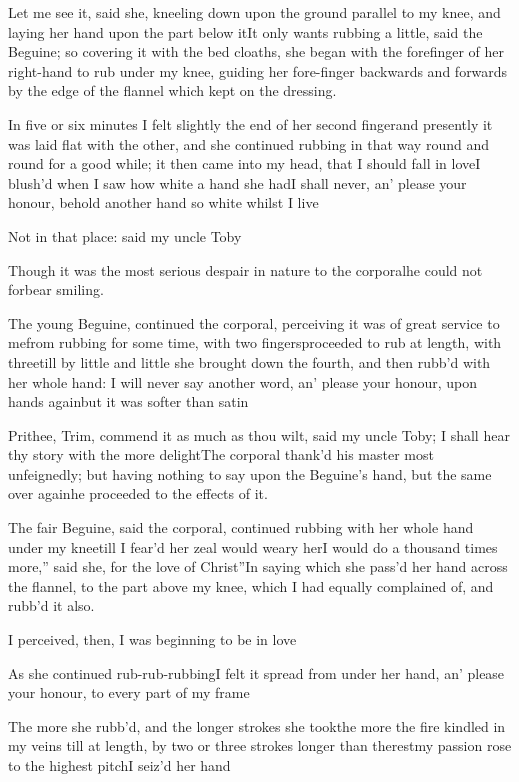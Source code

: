 \documentclass[twoside]{article}
\begin{document}
Let me see it, said she, kneeling down upon the ground parallel
to my knee, and laying her hand upon the part below
it\tsh It only wants rubbing a little, said the
Beguine; so covering it with the bed cloaths, she began with
the forefinger of her right-hand to rub under my knee, guiding her
fore-finger backwards and forwards by the edge of the flannel which
kept on the dressing.

In five or six minutes I felt slightly the end of
her second finger\tsk and presently it was laid flat with the
other, and she continued rubbing in that way round and round for a
good while; it then came into my head, that I should fall in
love\tsk\break I blush’d when I saw how white a hand she
had\tsk I shall never, an’ please your honour, behold
another hand so white whilst I live\tsh

\tsh Not in that place: said my uncle
Toby\tsh

Though it was the most serious des\-pair in nature to the
corporal\tsk he could not forbear smiling.

The young Beguine, continued the corporal, perceiving it
was of great service to me\tsk from rubbing for some time, with
two fingers\tsk proceeded to rub at length, with three\tsk till
by little and little she brought down the fourth, and then
rubb’d with her whole hand: I will never say another word,
an’ please your honour, upon hands again\tsk but it was
softer than satin\tsh

\tsh Prithee, Trim, commend it as much as thou
wilt, said my uncle Toby; I shall hear thy story with the
more delight\tsh The corporal thank’d his master
most unfeignedly; but having nothing to say upon the
Beguine’s hand, but the same over again\tsh he
proceeded to the effects of it.

The fair Beguine, said the corporal, continued rubbing with her whole
hand under my knee\tsk till I fear’d her zeal would weary
her\tsh \lqq I would do a\break
\lqq thousand times more,” said she, \lqq for\break
\lqq the love of Christ”\tsh In saying which\break
she pass’d her hand across the flannel, to\break
the part above my knee, which I had\break
equally complained of, and rubb’d it\break
also.


I perceived, then, I was beginning to be in
love\tsh

As she continued rub-rub-rubbing\tsk I felt it spread from
under her hand, an’ please your honour, to every part of my
frame\tsh

The more she rubb’d, and the longer strokes she
took\tsh the more the fire kindled in my veins \tsh till at length, by
two or three strokes longer than the\break rest\tsh my passion
rose to the highest pitch\tsh I seiz’d her
hand\tsh
\end{document}
